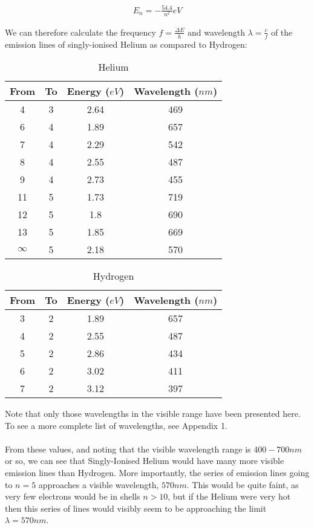 \documentclass[paper=a4, fontsize=12pt]{scrartcl}
\begin{document}
\begin{align*}
E_n = -\frac{54.4}{n^2} eV
\end{align*}

We can therefore calculate the frequency $f = \frac{\Delta E}{h}$ and wavelength $\lambda = \frac{c}{f}$ of the emission lines of singly-ionised Helium as compared to Hydrogen:

\begin{table}[h]
\caption {Helium}
\begin{center}
\begin{tabular}{| c | c | c | c |}
\hline
 From & To & Energy ($eV$) & Wavelength ($nm$)\\
 \hline
 4 & 3 & 2.64 & 469\\
 6 & 4 & 1.89 & 657\\
 7 & 4 & 2.29 & 542\\
 8 & 4 & 2.55 & 487\\
 9 & 4 & 2.73 & 455\\
 11 & 5 & 1.73 & 719\\
 12 & 5 & 1.8 & 690\\
 13 & 5 & 1.85 & 669\\
 $\infty$ & 5 & 2.18 & 570\\
 \hline
\end{tabular}
\end{center}
\end{table}

\begin{table}[h]
\caption {Hydrogen}
\begin{center}
\begin{tabular}{| c | c | c | c |}
\hline
 From & To & Energy ($eV$) & Wavelength ($nm$)\\
 \hline
 3 & 2 & 1.89 & 657\\
 4 & 2 & 2.55 & 487\\
 5 & 2 & 2.86 & 434\\
 6 & 2 & 3.02 & 411\\
 7 & 2 & 3.12 & 397\\
 \hline
\end{tabular}
\end{center}
\end{table}

Note that only those wavelengths in the visible range have been presented here. To see a more complete list of wavelengths, see Appendix 1.\\\\
From these values, and noting that the visible wavelength range is $400 - 700 nm$ or so, we can see that Singly-Ionised Helium would have many more visible emission lines than Hydrogen. More importantly, the series of emission lines going to $n=5$ approaches a visible wavelength, $570 nm$. This would be quite faint, as very few electrons would be in shells $n>10$, but if the Helium were very hot then this series of lines would visibly seem to be approaching the limit $\lambda = 570 nm$.
\end{document}
